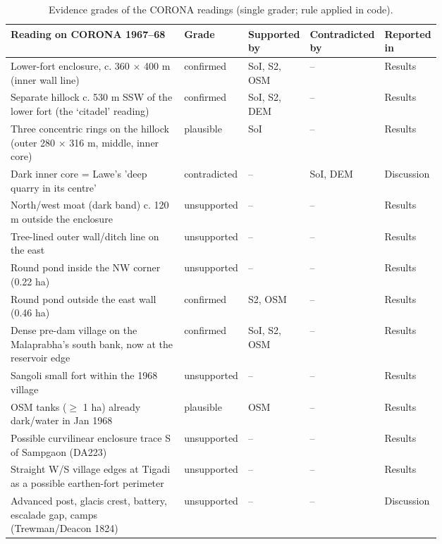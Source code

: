 \begin{table}[!htbp]
\centering
\footnotesize
\setlength{\tabcolsep}{4pt}
\caption{Evidence grades of the CORONA readings (single grader; rule applied in code).}
\label{tab:evidence}
\begin{adjustbox}{max width=\linewidth}
\begin{tabular}{>{\raggedright\arraybackslash}p{0.42\linewidth}l>{\raggedright\arraybackslash}p{0.14\linewidth}>{\raggedright\arraybackslash}p{0.15\linewidth}l}
\toprule
Reading on CORONA 1967--68 & Grade & Supported by & Contradicted by & Reported in \\
\midrule
Lower-fort enclosure, c. 360 $\times$ 400 m (inner wall line) & confirmed & SoI, S2, OSM & -- & Results \\
Separate hillock c. 530 m SSW of the lower fort (the `citadel' reading) & confirmed & SoI, S2, DEM & -- & Results \\
Three concentric rings on the hillock (outer 280 $\times$ 316 m, middle, inner core) & plausible & SoI & -- & Results \\
Dark inner core = Lawe's 'deep quarry in its centre' & contradicted & -- & SoI, DEM & Discussion \\
North/west moat (dark band) c. 120 m outside the enclosure & unsupported & -- & -- & Results \\
Tree-lined outer wall/ditch line on the east & unsupported & -- & -- & Results \\
Round pond inside the NW corner (0.22 ha) & unsupported & -- & -- & Results \\
Round pond outside the east wall (0.46 ha) & confirmed & S2, OSM & -- & Results \\
Dense pre-dam village on the Malaprabha's south bank, now at the reservoir edge & confirmed & SoI, S2, OSM & -- & Results \\
Sangoli small fort within the 1968 village & unsupported & -- & -- & Results \\
7 OSM tanks ($\geq$ 1 ha) already dark/water in Jan 1968 & plausible & OSM & -- & Results \\
Possible curvilinear enclosure trace S of Sampgaon (DA223) & unsupported & -- & -- & Results \\
Straight W/S village edges at Tigadi as a possible earthen-fort perimeter & unsupported & -- & -- & Results \\
Advanced post, glacis crest, battery, escalade gap, camps (Trewman/Deacon 1824) & unsupported & -- & -- & Discussion \\

\end{tabular}
\end{adjustbox}
\end{table}
